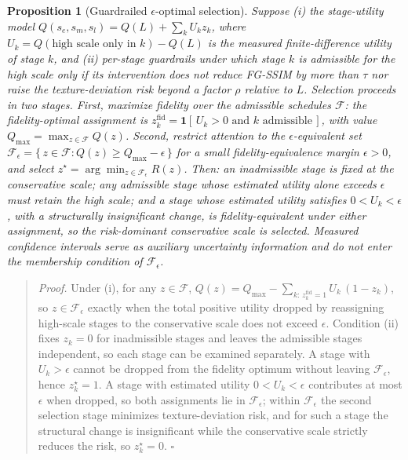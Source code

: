\documentclass[times,twocolumn,final]{elsarticle}
\newtheorem{proposition}{Proposition}
\begin{document}
\begin{proposition}[Guardrailed $\epsilon$-optimal selection]
\label{prop:cai}
Suppose (i) the stage-utility model $Q(s_e,s_m,s_l)=Q(L)+\sum_{k}U_k z_k$, where $U_k=Q(\text{high scale only in }k)-Q(L)$ is the measured finite-difference utility of stage $k$, and (ii) per-stage guardrails under which stage $k$ is admissible for the high scale only if its intervention does not reduce FG-SSIM by more than $\tau$ nor raise the texture-deviation risk beyond a factor $\rho$ relative to $L$. Selection proceeds in two stages. First, maximize fidelity over the admissible schedules $\mathcal{F}$: the fidelity-optimal assignment is $z_k^{\mathrm{fid}}=\mathbf{1}[\,U_k>0 \text{ and } k \text{ admissible}\,]$, with value $Q_{\max}=\max_{z\in\mathcal{F}}Q(z)$. Second, restrict attention to the $\epsilon$-equivalent set $\mathcal{F}_\epsilon=\{\,z\in\mathcal{F}: Q(z)\ge Q_{\max}-\epsilon\,\}$ for a small fidelity-equivalence margin $\epsilon>0$, and select $z^{\star}=\arg\min_{z\in\mathcal{F}_\epsilon}R(z)$. Then: an inadmissible stage is fixed at the conservative scale; any admissible stage whose estimated utility alone exceeds $\epsilon$ must retain the high scale; and a stage whose estimated utility satisfies $0<U_k<\epsilon$, with a structurally insignificant change, is fidelity-equivalent under either assignment, so the risk-dominant conservative scale is selected. Measured confidence intervals serve as auxiliary uncertainty information and do not enter the membership condition of $\mathcal{F}_\epsilon$.
\end{proposition}

\begin{quote}\small
\textit{Proof.} Under (i), for any $z\in\mathcal{F}$, $Q(z)=Q_{\max}-\sum_{k:\,z_k^{\mathrm{fid}}=1}U_k\,(1-z_k)$, so $z\in\mathcal{F}_\epsilon$ exactly when the total positive utility dropped by reassigning high-scale stages to the conservative scale does not exceed $\epsilon$. Condition (ii) fixes $z_k=0$ for inadmissible stages and leaves the admissible stages independent, so each stage can be examined separately. A stage with $U_k>\epsilon$ cannot be dropped from the fidelity optimum without leaving $\mathcal{F}_\epsilon$, hence $z_k^{\star}=1$. A stage with estimated utility $0<U_k<\epsilon$ contributes at most $\epsilon$ when dropped, so both assignments lie in $\mathcal{F}_\epsilon$; within $\mathcal{F}_\epsilon$ the second selection stage minimizes texture-deviation risk, and for such a stage the structural change is insignificant while the conservative scale strictly reduces the risk, so $z_k^{\star}=0$. \hfill$\square$
\end{quote}
\end{document}
